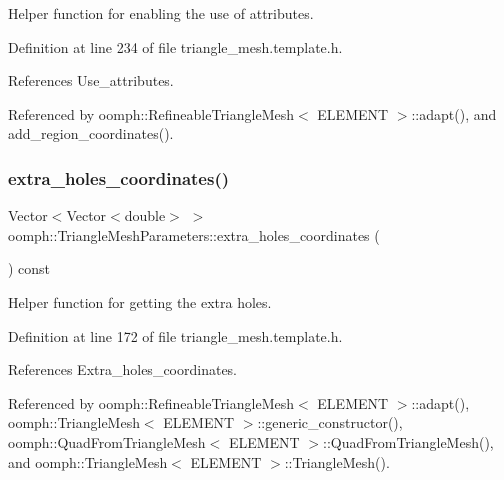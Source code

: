 Helper function for enabling the use of attributes. 



Definition at line 234 of file triangle\+\_\+mesh.\+template.\+h.



References Use\+\_\+attributes.



Referenced by oomph\+::\+Refineable\+Triangle\+Mesh$<$ E\+L\+E\+M\+E\+N\+T $>$\+::adapt(), and add\+\_\+region\+\_\+coordinates().

\mbox{\label{classoomph_1_1TriangleMeshParameters_a276f810c828931b720ce9dfc3d0af2af}} 
\subsubsection{\texorpdfstring{extra\+\_\+holes\+\_\+coordinates()}{extra\_holes\_coordinates()}\hspace{0.1cm}{\footnotesize\ttfamily [1/2]}}
{\footnotesize\ttfamily Vector$<$Vector$<$double$>$ $>$ oomph\+::\+Triangle\+Mesh\+Parameters\+::extra\+\_\+holes\+\_\+coordinates (\begin{DoxyParamCaption}{ }\end{DoxyParamCaption}) const\hspace{0.3cm}{\ttfamily [inline]}}



Helper function for getting the extra holes. 



Definition at line 172 of file triangle\+\_\+mesh.\+template.\+h.



References Extra\+\_\+holes\+\_\+coordinates.



Referenced by oomph\+::\+Refineable\+Triangle\+Mesh$<$ E\+L\+E\+M\+E\+N\+T $>$\+::adapt(), oomph\+::\+Triangle\+Mesh$<$ E\+L\+E\+M\+E\+N\+T $>$\+::generic\+\_\+constructor(), oomph\+::\+Quad\+From\+Triangle\+Mesh$<$ E\+L\+E\+M\+E\+N\+T $>$\+::\+Quad\+From\+Triangle\+Mesh(), and oomph\+::\+Triangle\+Mesh$<$ E\+L\+E\+M\+E\+N\+T $>$\+::\+Triangle\+Mesh().

